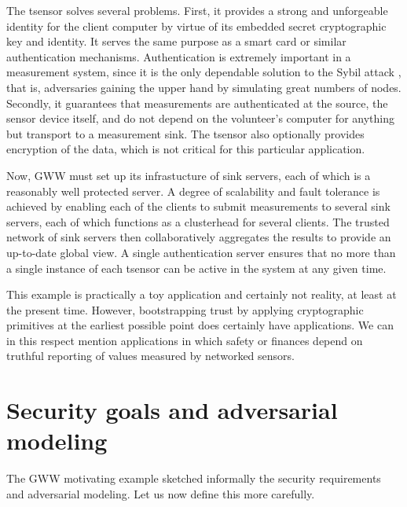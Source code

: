 The tsensor solves several problems. First, it provides a strong and unforgeable identity for the client computer by virtue of its embedded secret cryptographic key and identity. It serves the same purpose as a smart card or similar authentication mechanisms. Authentication is extremely important in a measurement system, since it is the only dependable solution to the Sybil attack , that is, adversaries gaining the upper hand by simulating great numbers of nodes. Secondly, it guarantees that measurements are authenticated at the source, the sensor device itself, and do not depend on the volunteer's computer for anything but transport to a measurement sink. The tsensor also optionally provides encryption of the data, which is not critical for this particular application.

Now, GWW must set up its infrastucture of sink servers, each of which is a reasonably well protected server. A degree of scalability and fault tolerance is achieved by enabling each of the clients to submit measurements to several sink servers, each of which functions as a clusterhead for several clients. The trusted network of sink servers then collaboratively aggregates the results to provide an up-to-date global view. A single authentication server ensures that no more than a single instance of each tsensor can be active in the system at any given time.

This example is practically a toy application and certainly not reality, at least at the present time. However, bootstrapping trust by applying cryptographic primitives at the earliest possible point does certainly have applications. We can in this respect mention applications in which safety or finances depend on truthful reporting of values measured by networked sensors.

\section{Security goals and adversarial modeling}

The GWW motivating example sketched informally the security requirements and adversarial modeling. Let us now define this more carefully.

